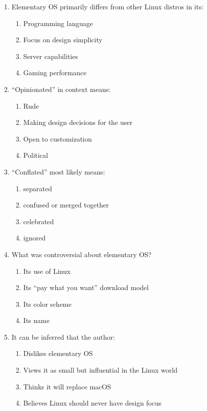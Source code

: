 \documentclass[10pt,a4paper]{article}
\begin{document}
\begin{enumerate}[label=\textbf{\arabic*.}]
\item Elementary OS primarily differs from other Linux distros in its:
\begin{enumerate}[label=(\Alph*)]
\item Programming language \item Focus on design simplicity
\item Server capabilities \item Gaming performance
\end{enumerate}

\item ``Opinionated'' in context means:
\begin{enumerate}[label=(\Alph*)]
\item Rude \item Making design decisions for the user
\item Open to customization \item Political
\end{enumerate}

\item ``Conflated'' most likely means:
\begin{enumerate}[label=(\Alph*)]
\item separated \item confused or merged together
\item celebrated \item ignored
\end{enumerate}

\item What was controversial about elementary OS?
\begin{enumerate}[label=(\Alph*)]
\item Its use of Linux
\item Its ``pay what you want'' download model
\item Its color scheme
\item Its name
\end{enumerate}

\item It can be inferred that the author:
\begin{enumerate}[label=(\Alph*)]
\item Dislikes elementary OS
\item Views it as small but influential in the Linux world
\item Thinks it will replace macOS
\item Believes Linux should never have design focus
\end{enumerate}
\end{enumerate}
\end{document}
